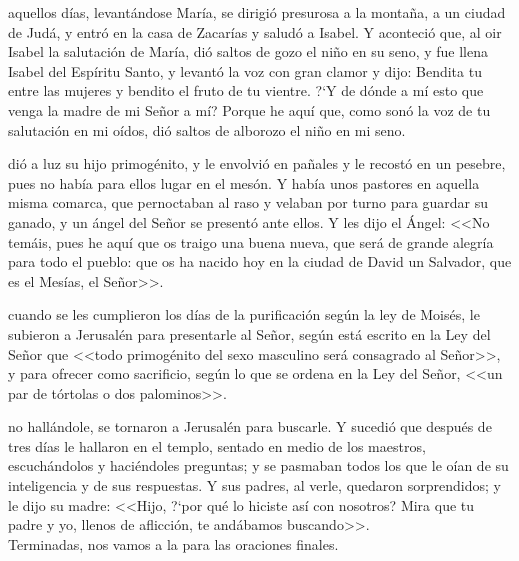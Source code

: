 \documentclass[10pt,twoside]{book}
\begin{document}
\vspace{2mm}
aquellos días, levantándose María, se dirigió presurosa a la montaña, a un ciudad de Judá, y entró en la casa de Zacarías y saludó a Isabel.
Y aconteció que, al oir Isabel la salutación de María, dió saltos de gozo el niño en su seno, y fue llena Isabel del Espíritu Santo, y levantó la voz con gran clamor y dijo:
Bendita tu entre las mujeres y bendito el fruto de tu vientre. {?`}Y de dónde a mí esto que venga la madre de mi Señor a mí? Porque he aquí que, como sonó la voz de tu salutación en mi oídos,
dió saltos de alborozo el niño en mi seno.\\[2mm]

\vspace{5mm}

\vspace{2mm}
\space dió a luz su hijo primogénito, y le envolvió en pañales y le recostó en un pesebre, pues no había para ellos lugar en el mesón.
Y había unos pastores en aquella misma comarca, que pernoctaban al raso y velaban por turno para guardar su ganado, y un ángel del Señor se presentó ante ellos.
Y les dijo el Ángel: <<No temáis, pues he aquí que os traigo una buena nueva, que será de grande alegría para todo el pueblo: 
que os ha nacido hoy en la ciudad de David un Salvador, que es el Mesías, el Señor>>.\\[2mm]

\vspace{5mm}

\vspace{2mm}
\space cuando se les cumplieron los días de la purificación según la ley de Moisés, le subieron a Jerusalén para presentarle al Señor,
según está escrito en la Ley del Señor que <<todo primogénito del sexo masculino será consagrado al Señor>>, y para ofrecer como sacrificio,
según lo que se ordena en la Ley del Señor, <<un par de tórtolas o dos palominos>>.\\[2mm]

\vspace{5mm}

\vspace{2mm}
\space no hallándole, se tornaron a Jerusalén para buscarle. Y sucedió que después de tres días le hallaron en el templo,
sentado en medio de los maestros, escuchándolos y haciéndoles preguntas; y se pasmaban todos los que le oían de su inteligencia y de sus respuestas.
Y sus padres, al verle, quedaron sorprendidos; y le dijo su madre: <<Hijo, {?`}por qué lo hiciste así con nosotros? Mira que tu padre y yo, llenos de aflicción, 
te andábamos buscando>>.\\[2mm]
{} Terminadas, nos vamos a la  para las oraciones finales.\\[5mm]
\end{document}

